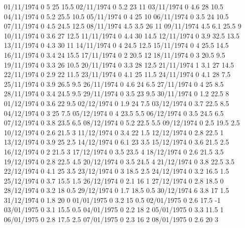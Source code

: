 01/11/1974  0      5      25     15.5 
02/11/1974  0      5.2    23     11 
03/11/1974  0      4.6    28     10.5 
04/11/1974  0      5.2    25.5   10.5 
05/11/1974  0      4      25     10 
06/11/1974  0      3.5    24     10.5 
07/11/1974  0      4.5    24.5   12.5 
08/11/1974  4.5    3.5    26     11 
09/11/1974  4.5    6.1    25.5   9 
10/11/1974  0      3.6    27     12.5 
11/11/1974  0      4.4    30     14.5 
12/11/1974  0      3.9    32.5   13.5 
13/11/1974  0      4.3    30     11 
14/11/1974  0      4      24.5   12.5 
15/11/1974  0      4      25.5   14.5 
16/11/1974  0      3.4    24     15.5 
17/11/1974  0      2      20.5   12 
18/11/1974  0      3      20.5   9.5 
19/11/1974  0      3.3    26     10.5 
20/11/1974  0      3.3    28     12.5 
21/11/1974  1      3.1    27     14.5 
22/11/1974  0      2.9    22     11.5 
23/11/1974  0      4.1    25     11.5 
24/11/1974  0      4.1    28     7.5 
25/11/1974  0      3.9    26.5   9.5 
26/11/1974  0      4.6    24     6.5 
27/11/1974  0      4      25     8.5 
28/11/1974  0      3.4    24.5   9.5 
29/11/1974  0      3.5    23     9.5 
30/11/1974  0      1.2    22.5   8 
01/12/1974  0      3.6    22     9.5 
02/12/1974  0      1.9    24     7.5 
03/12/1974  0      3.7    22.5   8.5 
04/12/1974  0      3      25     7.5 
05/12/1974  0      4      23.5   5.5 
06/12/1974  0      3.5    24.5   6.5 
07/12/1974  0      3.8    23.5   6.5 
08/12/1974  0      5.2    22.5   5.5 
09/12/1974  0      2.5    19.5   2.5 
10/12/1974  0      2.6    21.5   3 
11/12/1974  0      3.4    22     1.5 
12/12/1974  0      2.8    22.5   1 
13/12/1974  0      3.9    25     2.5 
14/12/1974  0      6.1    23     3.5 
15/12/1974  0      3.6    21.5   2.5 
16/12/1974  0      2      21.5   3 
17/12/1974  0      3.5    23.5   4 
18/12/1974  0      2.6    21.5   3.5 
19/12/1974  0      2.8    22.5   4.5 
20/12/1974  0      3.5    24.5   4 
21/12/1974  0      3.8    22.5   3.5 
22/12/1974  0      4.1    25     3.5 
23/12/1974  0      3      18.5   2.5 
24/12/1974  0      3.2    16.5   1.5 
25/12/1974  0      3.7    15.5   1.5 
26/12/1974  0      2.1    16     1 
27/12/1974  0      2.8    18.5   0 
28/12/1974  0      3.2    18     0.5 
29/12/1974  0      1.7    18.5   0.5 
30/12/1974  6      3.8    17     1.5 
31/12/1974  0      1.8    20     0 
01/01/1975  0      3.2    15     0.5 
02/01/1975  0      2.6    17.5  -1 
03/01/1975  0      3.1    15.5   0.5 
04/01/1975  0      2.2    18     2 
05/01/1975  0      3.3    11.5   1 
06/01/1975  0      2.8    17.5   2.5 
07/01/1975  0      2.3    16     2 
08/01/1975  0      2.6    20     3 
